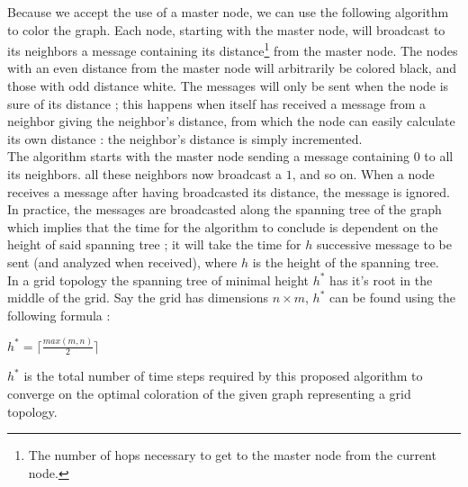 \documentclass[letterpaper]{article}
\begin{document}
Because we accept the use of a master node, we can use the following algorithm to color the graph. Each node, starting with the master node, will broadcast to its neighbors a message containing its distance\footnote{The number of hops necessary to get to the master node from the current node.} from the master node. The nodes with an even distance from the master node will arbitrarily be colored black, and those with odd distance white. The messages will only be sent when the node is sure of its distance ; this happens when itself has received a message from a neighbor giving the neighbor's distance, from which the node can easily calculate its own distance : the neighbor's distance is simply incremented.\\

The algorithm starts with the master node sending a message containing $0$ to all its neighbors. all these neighbors now broadcast a $1$, and so on. When a node receives a message after having broadcasted its distance, the message is ignored.\\
In practice, the messages are broadcasted along the spanning tree of the graph which implies that the time for the algorithm to conclude is dependent on the height of said spanning tree ; it will take the time for $h$ successive message to be sent (and analyzed when received), where $h$ is the height of the spanning tree.\\

In a grid topology the spanning tree of minimal height $h^*$ has it's root in the middle of the grid. Say the grid has dimensions $n\times m$, $h^*$ can be found using the following formula :\\
\begin{center}$h^* = \lceil{\frac{max(m,n)}{2}}\rceil$\end{center}
$h^*$ is the total number of time steps required by this proposed algorithm to converge on the optimal coloration of the given graph representing a grid topology.

\footnotesize


\end{document}
